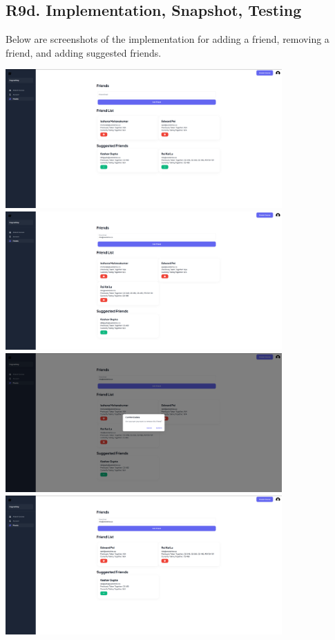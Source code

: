 \documentclass[12pt, a4paper]{article}
\begin{document}
\subsection*{R9d. Implementation, Snapshot, Testing}
Below are screenshots of the implementation for adding a friend, removing a friend, and adding suggested friends. 
\begin{center}
    \includegraphics[width=400px]{R9/i1}
    \includegraphics[width=400px]{R9/i2}   
    \includegraphics[width=400px]{R9/i3}
    \includegraphics[width=400px]{R9/i4}
\end{center}
\end{document}
